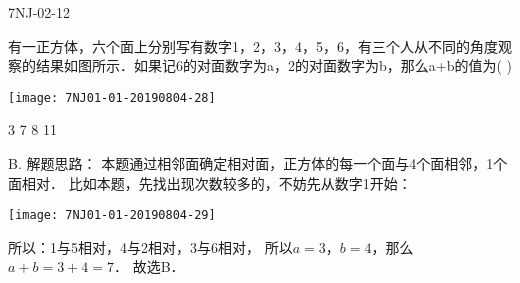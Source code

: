 \begin{defproblem}{7NJ-02-12}%
\begin{onlyproblem}%
有一正方体，六个面上分别写有数字1，2，3，4，5，6，有三个人从不同的角度观察的结果如图所示．如果记6的对面数字为a，2的对面数字为b，那么a+b的值为(    )
\begin{center}
\texttt{[image: 7NJ01-01-20190804-28]}
\end{center}

\xx
{3}
{7}
{8}
{11}

\end{onlyproblem}%
\begin{onlysolution}%
\begin{solution}%
B. 
解题思路： 本题通过相邻面确定相对面，正方体的每一个面与4个面相邻，1个面相对． 比如本题，先找出现次数较多的，不妨先从数字1开始：
\begin{center}
\texttt{[image: 7NJ01-01-20190804-29]}
\end{center}
 所以：1与5相对，4与2相对，3与6相对， 所以$a=3$，$b=4$，那么$a+b=3+4=7$． 故选B．  
\end{solution}%
\end{onlysolution}%
\end{defproblem}






